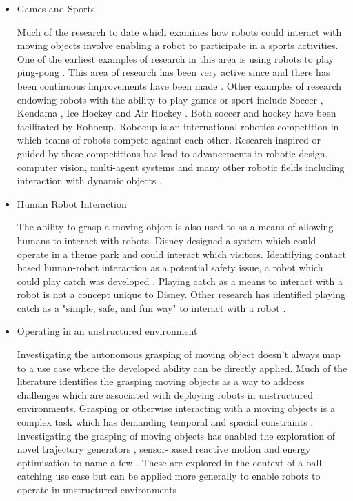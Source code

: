 \begin{itemize}
    \item Games and Sports
    
    Much of the research to date which examines how robots could interact with moving objects involve enabling a robot to participate in a sports activities. One of the earliest examples of research in this area is using robots to play ping-pong \cite{Anderson1989}. This area of research has been very active since and there has been continuous improvements have been made \cite{Koc2018}. Other examples of research endowing robots with the ability to play games or sport include Soccer \cite{RoboCupSoccer}, Kendama \cite{Kendama}, Ice Hockey \cite{IceHockey} and Air Hockey \cite{AirHockey}. Both soccer and hockey have been facilitated by Robocup. Robocup is an international robotics competition in which teams of robots compete against each other. Research inspired or guided by these competitions has lead to advancements in robotic design, computer vision, multi-agent systems and many other robotic fields including interaction with dynamic objects \cite{RoboCupSoccer, FuzzyRobocup}. 
    
    \item Human Robot Interaction
    
    The ability to grasp a moving object is also used to as a means of allowing humans to interact with robots. Disney designed a system which could operate in a theme park and could interact which visitors. Identifying contact based human-robot interaction as a potential safety issue, a robot which could play catch was developed \cite{DisneyRobot}. Playing catch as a means to interact with a robot is not a concept unique to Disney. Other research has identified playing catch as a "simple, safe, and fun way" to interact with a robot \cite{JugglingWithKitchenFunnels}.
    
    \item Operating in an unstructured environment
    
    Investigating the autonomous grasping of moving object doesn't always map to a use case where the developed ability can be directly applied. Much of the literature identifies the grasping moving objects as a way to address challenges which are associated with deploying robots in unstructured environments. Grasping or otherwise interacting with a moving objects is a complex task which has demanding temporal and spacial constraints \cite{Anderson1989, EarlyAnticipation}. Investigating the grasping of moving objects has enabled the exploration of novel trajectory generators \cite{Senoo2006, Lampariello2011}, sensor-based reactive motion \cite{Senoo2006} and energy optimisation \cite{Lampariello2011} to name a few . These are explored in the context of a ball catching use case but can be applied more generally to enable robots to operate in unstructured environments 
\end{itemize}


